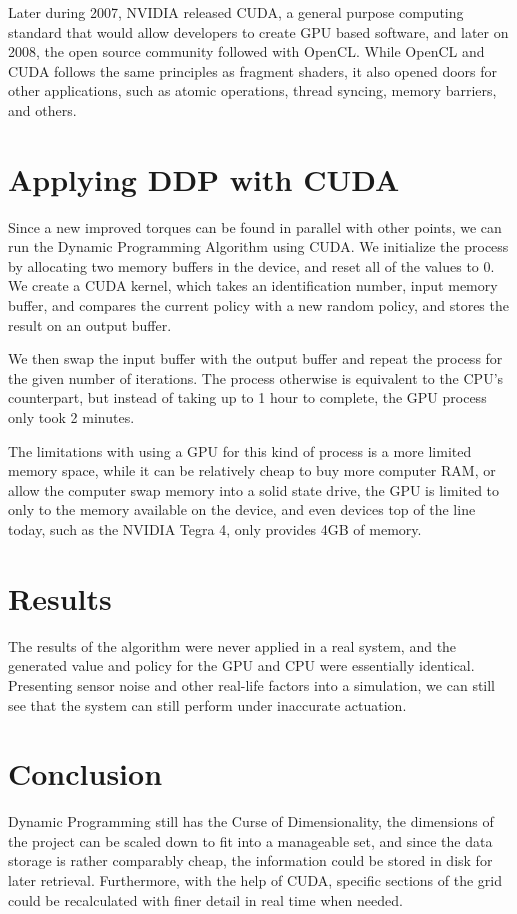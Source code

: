 \documentclass[12pt]{report}
\begin{document}
Later during 2007, NVIDIA released CUDA, a general purpose computing standard that would allow developers to create GPU based software, and later on 2008, the open source community followed with OpenCL. While OpenCL and CUDA follows the same principles as fragment shaders, it also opened doors for other applications, such as atomic operations, thread syncing, memory barriers, and others.

\section{Applying DDP with CUDA}
Since a new improved torques can be found in parallel with other points, we can run the Dynamic Programming Algorithm using CUDA.  We initialize the process by allocating two memory buffers in the device, and reset all of the values to 0.  We create a CUDA kernel, which takes an identification number, input memory buffer, and compares the current policy with a new random policy, and stores the result on an output buffer. 

We then swap the input buffer with the output buffer and repeat the process for the given number of iterations.  The process otherwise is equivalent to the CPU’s counterpart, but instead of taking up to 1 hour to complete, the GPU process only took 2 minutes. 

The limitations with using a GPU for this kind of process is a more limited memory space, while it can be relatively cheap to buy more computer RAM, or allow the computer swap memory into a solid state drive, the GPU is limited to only to the memory available on the device, and even devices top of the line today, such as the NVIDIA Tegra 4, only provides 4GB of memory. 

\section{Results}
The results of the algorithm were never applied in a real system, and the generated value and policy for the GPU and CPU were essentially identical. Presenting sensor noise and other real-life factors into a simulation, we can still see that the system can still perform under inaccurate actuation. \cite{eric_thesis}

\section{Conclusion}
Dynamic Programming still has the Curse of Dimensionality, the dimensions of the project can be scaled down to fit into a manageable set, and since the data storage is rather comparably cheap, the information could be stored in disk for later retrieval. Furthermore, with the help of CUDA, specific sections of the grid could be recalculated with finer detail in real time when needed. 
\end{document}
